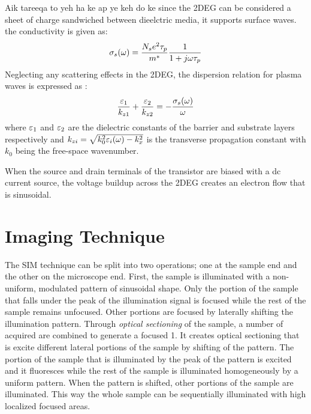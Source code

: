 \documentclass[11pt]{article}
\begin{document}
Aik tareeqa to yeh ha ke ap ye keh do ke since the 2DEG can be considered a sheet of charge sandwiched between dieelctric media, it supports surface waves. the conductivity is given as:
%
\begin{equation}
  \sigma_s(\omega) = \frac{N_s e^2 \tau_{p}}{m^{\ast}}\frac{1}{1 + j \omega \tau_{p}}
  \label{eq:conductivity}
\end{equation}
%
Neglecting any scattering effects in the 2DEG, the dispersion relation for plasma waves is expressed as \cite{Nakayama_1974}:
%
\begin{equation}
  \frac{\varepsilon_1}{k_{z1}} + \frac{\varepsilon_2}{k_{z2}} = -\frac{\sigma_s(\omega)}{\omega}
  \label{eq:disp_TM_two}
\end{equation}
%
where $\varepsilon_1$ and $\varepsilon_2$ are the dielectric constants of the barrier and substrate layers respectively and $k_{zi} = \sqrt{k_0^2 \varepsilon_i(\omega) -  k_x^2}$ is the transverse propagation constant with $k_0$ being the free-space wavenumber.


When the source and drain terminals of the transistor are biased with a dc current source, the voltage buildup across the 2DEG creates an electron flow that is sinusoidal.
\begin{equation}
\end{equation}

\section{Imaging Technique}
%
The SIM technique can be split into two operations; one at the sample end and the other on the microscope end. First, the sample is illuminated with a non-uniform, modulated pattern of sinusoidal shape. Only the portion of the sample that falls under the peak of the illumination signal is focused while the rest of the sample remains unfocused. Other portions are focused by laterally shifting the illumination pattern. Through \emph{optical sectioning} of the sample, a number of acquired are combined to generate a focused
1. It creates optical sectioning that is excite different lateral portions of the sample by shifting of the pattern. The portion of the sample that is illuminated by the peak of the pattern is excited and it fluoresces while the rest of the sample is illuminated homogeneously by a uniform pattern. When the pattern is shifted, other portions of the sample are illuminated. This way the whole sample can be sequentially illuminated with high localized focused areas.
\end{document}
